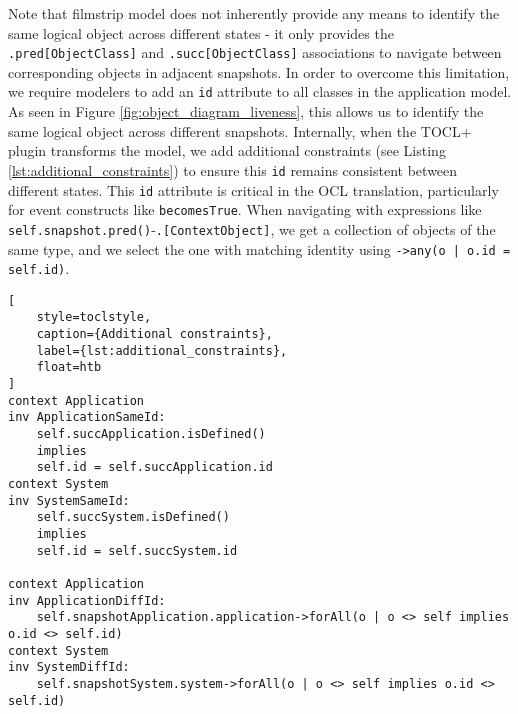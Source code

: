 Note that filmstrip model does not inherently provide any means to identify the same 
logical object across different states - it only provides the \texttt{.pred[ObjectClass]} and \texttt{.succ[ObjectClass]} 
associations to navigate between corresponding objects in adjacent snapshots. 
In order to overcome this limitation, we require modelers to add an \texttt{id} attribute 
to all classes in the application model. As seen in Figure \ref{fig:object_diagram_liveness}, 
this allows us to identify the same logical object across different snapshots. 
Internally, when the TOCL+ plugin transforms the model, we add additional 
constraints (see Listing \ref{lst:additional_constraints}) to ensure this \texttt{id} remains consistent between different states. 
This \texttt{id} attribute is critical in the OCL translation, particularly for event 
constructs like \texttt{becomesTrue}. When navigating with expressions like 
\texttt{self.snapshot.pred()}-\texttt{.[ContextObject]}, we get a collection of objects of the same 
type, and we select the one with matching identity using \texttt{->any(o | o.id = self.id)}.

\begin{lstlisting}[
    style=toclstyle,
    caption={Additional constraints},
    label={lst:additional_constraints},
    float=htb
]
context Application
inv ApplicationSameId: 
    self.succApplication.isDefined() 
    implies 
    self.id = self.succApplication.id
context System
inv SystemSameId: 
    self.succSystem.isDefined() 
    implies 
    self.id = self.succSystem.id

context Application
inv ApplicationDiffId: 
    self.snapshotApplication.application->forAll(o | o <> self implies o.id <> self.id)
context System
inv SystemDiffId: 
    self.snapshotSystem.system->forAll(o | o <> self implies o.id <> self.id)
\end{lstlisting}


